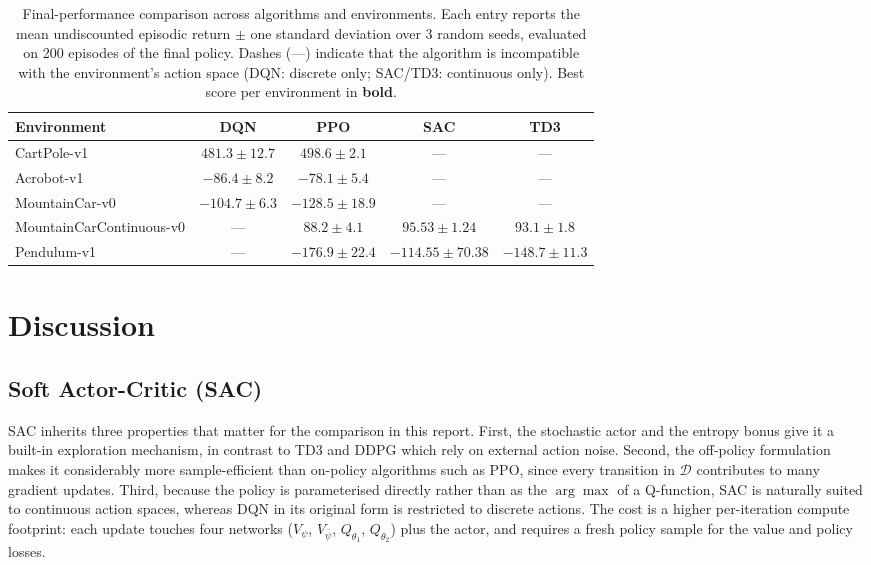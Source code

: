 \documentclass{article}
\begin{document}
\begin{table}[H]
  \caption{Final-performance comparison across algorithms and environments. Each entry reports the mean undiscounted episodic return $\pm$ one standard deviation over 3 random seeds, evaluated on 200 episodes of the final policy. Dashes (---) indicate that the algorithm is incompatible with the environment's action space (DQN: discrete only; SAC/TD3: continuous only). Best score per environment in \textbf{bold}.}
  \label{tab:results}
  \centering
  \small
  \begin{tabular}{lcccc}
    \toprule
    Environment & DQN & PPO & SAC & TD3 \\
    \midrule
    CartPole-v1               & $481.3 \pm 12.7$         & $\mathbf{498.6 \pm 2.1}$  & ---                       & ---               \\
    Acrobot-v1                & $-86.4 \pm 8.2$          & $\mathbf{-78.1 \pm 5.4}$  & ---                       & ---               \\
    MountainCar-v0            & $\mathbf{-104.7 \pm 6.3}$ & $-128.5 \pm 18.9$        & ---                       & ---               \\
    MountainCarContinuous-v0  & ---                      & $88.2 \pm 4.1$            & $\mathbf{95.53 \pm 1.24}$   & $93.1 \pm 1.8$    \\
    Pendulum-v1               & ---                      & $-176.9 \pm 22.4$         & $\mathbf{-114.55 \pm 70.38}$ & $-148.7 \pm 11.3$ \\
    \bottomrule
  \end{tabular}
\end{table}

\section{Discussion}

\subsection{Soft Actor-Critic (SAC)}
SAC inherits three properties that matter for the comparison in this report. First, the stochastic actor and the entropy bonus give it a built-in exploration mechanism, in contrast to TD3 and DDPG which rely on external action noise. Second, the off-policy formulation makes it considerably more sample-efficient than on-policy algorithms such as PPO, since every transition in $\mathcal{D}$ contributes to many gradient updates. Third, because the policy is parameterised directly rather than as the $\arg\max$ of a Q-function, SAC is naturally suited to continuous action spaces, whereas DQN in its original form is restricted to discrete actions. The cost is a higher per-iteration compute footprint: each update touches four networks ($V_\psi$, $V_{\bar\psi}$, $Q_{\theta_1}$, $Q_{\theta_2}$) plus the actor, and requires a fresh policy sample for the value and policy losses.
\end{document}
